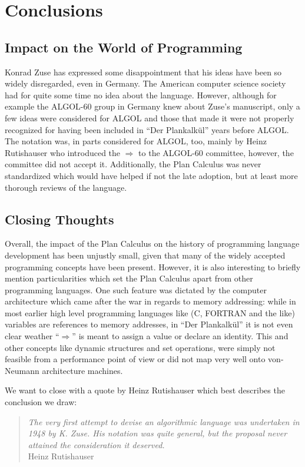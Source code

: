 \documentclass{llncs}
\begin{document}
 \section{Conclusions}
 \subsection{Impact on the World of Programming}
   Konrad Zuse has expressed some disappointment that his ideas have
   been so widely disregarded, even in Germany\cite{giloi2002konrad}. 
   The American computer science society had for quite some time 
   no idea about the language. However, although 
   for example the ALGOL-60 group in Germany knew about Zuse's manuscript, 
   only a few ideas were considered for ALGOL and those that made it 
   were not properly recognized for having been included in ``Der Plankalkül''
   years before ALGOL\cite{giloi2002konrad}. The notation was, in parts considered 
   for ALGOL, too, mainly by Heinz Rutishauser who introduced the $\Rightarrow$ 
   to the ALGOL-60 committee, however, the committee did not accept it\cite{epegmagHorstzuse}. 
   Additionally, the Plan Calculus was never standardized which would have helped 
   if not the late adoption, but at least more thorough reviews of the language. 

   \subsection{Closing Thoughts}
   Overall, the impact of the Plan Calculus on the history of programming language
   development has been unjustly small, given that many of the widely accepted programming 
   concepts have been present. However, it is also interesting to briefly mention 
   particularities which set the Plan Calculus apart from other programming languages. 
   One such feature was dictated by the computer architecture which came after 
   the war in regards to memory addressing: while in most earlier high level programming 
   languages like (C, FORTRAN and the like) variables are references to memory addresses, 
   in ``Der Plankalkül'' it is not even clear weather ``$\Rightarrow$'' is meant to assign a value 
   or declare an identity. This and other concepts like dynamic structures and set 
   operations, were simply not feasible from a performance point of view 
   or did not map very well onto von-Neumann architecture machines.

   We want to close with a quote by Heinz Rutishauser which best describes the 
   conclusion we draw:
   \begin{quote}
   \raggedright
   {\it The very first attempt to devise an algorithmic language was undertaken in 1948 by K. Zuse. His notation 
   was quite general, but the proposal never attained the consideration it deserved.}\\
   \raggedleft Heinz Rutishauser
   \end{quote}
\end{document}
